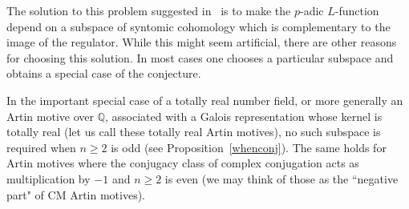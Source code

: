 \documentclass{amsart}
\begin{document}
The solution to this problem suggested in~\cite{Peri96} is to make the
{$p$-adic{\futurelet{}}} {$L$-function{\futurelet{}}} depend on a subspace of syntomic cohomology which
is complementary to the image of the regulator. While this might seem
artificial, there are other reasons for choosing
this solution. In most cases one chooses a particular subspace and
obtains a special case of the conjecture.

In the important special case of a totally real number field, or more generally an
Artin motive over $ {\mathbb Q} $, associated with a Galois
representation whose kernel is totally real 
(let us call these totally real Artin motives), no such subspace
is required when $ n\ge2 $ is odd
(see Proposition~\ref{whenconj}).  The same holds for Artin motives where the conjugacy class of complex
conjugation acts as multiplication by $ -1 $ and $ n \ge2 $ is even (we may think of those as the ``negative
part" of CM Artin motives).
\end{document}
